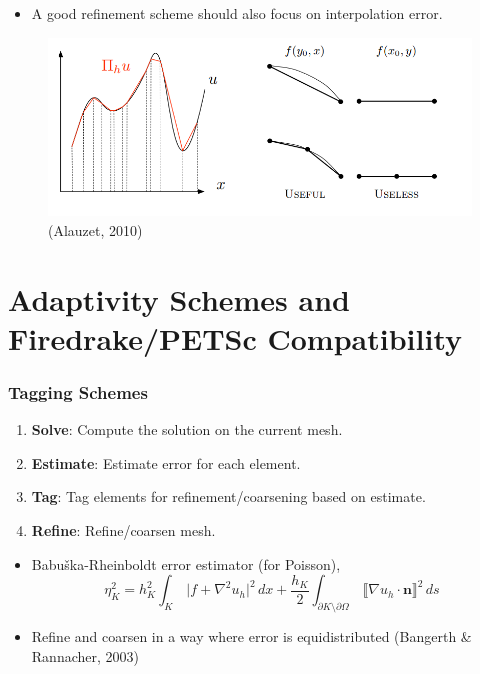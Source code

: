 \documentclass{beamer}
\begin{document}
  \begin{frame}
	\begin{itemize}
		\item A good refinement scheme should also focus on interpolation error. 
	\end{itemize}

		\begin{center}
		\begin{figure}
				\includegraphics[width=\textwidth]{Figures/refinementinterp.png}
				\caption{(Alauzet, 2010)}
			\end{figure}
		\end{center}
  \end{frame}


\section{Adaptivity Schemes and Firedrake/PETSc Compatibility}
\tableofcontents[currentsection]


  \begin{frame}
	\frametitle{Tagging Schemes}
	\begin{enumerate}
		\item \textbf{Solve}: Compute the solution on the current mesh.
		\item \textbf{Estimate}: Estimate error for each element.
		\item \textbf{Tag}: Tag elements for refinement/coarsening based on estimate.
		\item \textbf{Refine}: Refine/coarsen mesh.
	\end{enumerate}
	
	\vfill
	
	\begin{itemize}
		\item Babuška-Rheinboldt error estimator (for Poisson), 
		\[
			\eta_K^2 =  h_K^2 \int_K  \, \Big| f + \nabla^2 u_h \Big|^2 \, dx + \frac{h_K}{2} \int_{\partial K \setminus \partial \Omega} \, \llbracket \nabla u_h \cdot \mathbf{n} \rrbracket^2 \, ds 
		\]

		\item Refine and coarsen in a way where error is equidistributed (Bangerth \& Rannacher, 2003)
	\end{itemize}
  \end{frame}
\end{document}
